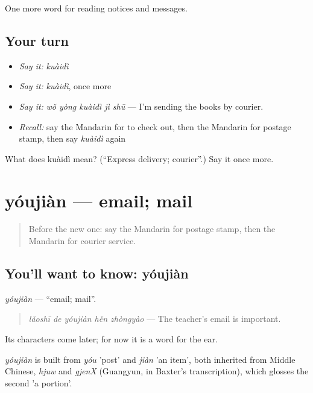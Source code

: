 \begin{grammarlens}[title={What you've built}]
One more word for reading notices and messages.
\end{grammarlens}

\subsection*{Your turn}
\begin{itemize}
\raggedright
  \item \emph{Say it:} \emph{kuàidì}
  \item \emph{Say it:} \emph{kuàidì}, once more
  \item \emph{Say it:} \emph{wǒ yòng kuàidì jì shū} — I'm sending the books by courier.
  \item \emph{Recall:} say the Mandarin for to check out, then the Mandarin for postage stamp, then say \emph{kuàidì} again
\end{itemize}

\begin{tcolorbox}[breakable,colback=teal!4,colframe=teal!35!black,title={Before you move on}]
What does kuàidì mean? (\textquotedblleft{}Express delivery; courier\textquotedblright{}.) Say it once more.
\end{tcolorbox}
\section[yóujiàn]{yóujiàn — email; mail}

\label{lesson:ZH-C201-youjian}



\begin{quote}
Before the new one: say the Mandarin for postage stamp, then the Mandarin for courier service.
\end{quote}

\subsection*{You'll want to know: yóujiàn}
\emph{yóujiàn} — \textquotedblleft{}email; mail\textquotedblright{}.

\begin{quote}
\emph{lǎoshī de yóujiàn hěn zhòngyào} — The teacher's email is important.
\end{quote}

Its characters come later; for now it is a word for the ear.

\begin{cousinweb}
\emph{yóujiàn} is built from \emph{yóu} 'post' and \emph{jiàn} 'an item', both inherited from Middle Chinese, \emph{hjuw} and \emph{gjenX} (Guangyun, in Baxter's transcription), which glosses the second 'a portion'.
\end{cousinweb}

